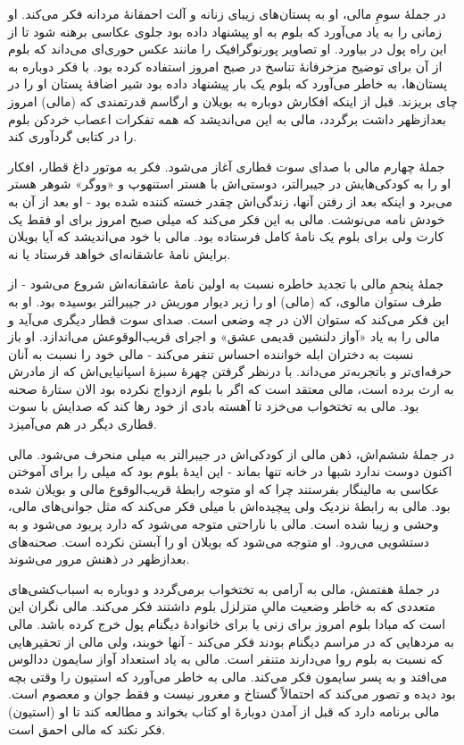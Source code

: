 \documentclass[12pt]{book}
\begin{document}
    در جملۀ سومِ مالی، او به پستان‌های زیبای زنانه و آلت احمقانۀ مردانه فکر می‌کند. او زمانی را به یاد می‌آورد که بلوم به او پیشنهاد داده بود جلوی عکاسی برهنه شود تا از این راه پول در بیاورد. او تصاویر پورنوگرافیک را مانند عکس حوری‌ای می‌داند که بلوم از آن برای توضیح مزخرفانۀ تناسخ در صبح امروز استفاده کرده بود. با فکر دوباره به پستان‌ها، به خاطر می‌آورد که بلوم یک بار پیشنهاد داده بود شیر اضافۀ پستان او را در چای بریزند. قبل از اینکه افکارش دوباره به بویلان و ارگاسم قدرتمندی که (مالی) امروز بعدازظهر داشت برگردد، مالی به این می‌اندیشد که همه تفکرات اعصاب خردکن بلوم را در کتابی گردآوری کند.

    جملۀ چهارم مالی با صدای سوت قطاری آغاز می‌شود. فکر به موتور داغ قطار، افکار او را به کودکی‌هایش در جیبرالتر، دوستی‌اش با هستر استنهوپ و «ووگر» شوهر هستر می‌برد و اینکه بعد از رفتن آنها، زندگی‌اش چقدر خسته کننده شده بود - او بعد از آن به خودش نامه می‌نوشت. مالی به این فکر می‌کند که میلی صبح امروز برای او فقط یک کارت ولی برای بلوم یک نامۀ کامل فرستاده بود. مالی با خود می‌اندیشد که آیا بویلان برایش نامۀ عاشقانه‌ای خواهد فرستاد یا نه.

    جملۀ پنجمِ مالی با تجدید خاطره نسبت به اولین نامۀ عاشقانه‌اش شروع می‌شود - از طرف ستوان مالوی، که (مالی) او را زیر دیوار موریش در جیبرالتر بوسیده بود. او به این فکر می‌کند که ستوان الان در چه وضعی است. صدای سوت قطار دیگری می‌آید و مالی را به یاد «آواز دلنشین قدیمی عشق» و اجرای قریب‌الوقوعش می‌اندازد. او باز نسبت به دختران ابله خواننده احساس تنفر می‌کند - مالی خود را نسبت به آنان حرفه‌ای‌تر و باتجربه‌تر می‌داند. با درنظر گرفتن چهرۀ سبزۀ اسپانیایی‌اش که از مادرش به ارث برده است، مالی معتقد است که اگر با بلوم ازدواج نکرده بود الان ستارۀ صحنه بود. مالی به تختخواب می‌خزد تا آهسته بادی از خود رها کند که صدایش با سوت قطاری دیگر در هم می‌آمیزد.

    در جملۀ ششم‌اش، ذهن مالی از کودکی‌اش در جیبرالتر به میلی منحرف می‌شود. مالی اکنون دوست ندارد شبها در خانه تنها بماند - این ایدۀ بلوم بود که میلی را برای آموختن عکاسی به مالینگار بفرستند چرا که او متوجه رابطۀ قریب‌الوقوع مالی و بویلان شده بود. مالی به رابطۀ نزدیک ولی پیچیده‌اش با میلی فکر می‌کند که مثل جوانی‌های مالی، وحشی و زیبا شده است. مالی با ناراحتی متوجه می‌شود که دارد پریود می‌شود و به دستشویی می‌رود. او متوجه می‌شود که بویلان او را آبستن نکرده است. صحنه‌های بعدازظهر در ذهنش مرور می‌شوند.

    در جملۀ هفتمش، مالی به آرامی به تختخواب برمی‌گردد و دوباره به اسباب‌کشی‌های متعددی که به خاطر وضعیت مالیِ متزلزل بلوم داشتند فکر می‌کند. مالی نگران این است که مبادا بلوم امروز برای زنی یا برای خانوادۀ دیگنام پول خرج کرده باشد. مالی به مردهایی که در مراسم دیگنام بودند فکر می‌کند - آنها خوبند، ولی مالی از تحقیرهایی که نسبت به بلوم روا می‌دارند متنفر است. مالی به یاد استعداد آواز سایمون ددالوس می‌افتد و به پسر سایمون فکر می‌کند. مالی به خاطر می‌آورد که استیون را وقتی بچه بود دیده و تصور می‌کند که احتمالاً گستاخ و مغرور نیست و فقط جوان و معصوم است. مالی برنامه دارد که قبل از آمدن دوبارۀ او کتاب بخواند و مطالعه کند تا او (استیون) فکر نکند که مالی احمق است.
\end{document}
